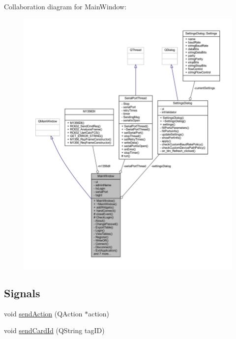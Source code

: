 Collaboration diagram for Main\+Window\+:
\nopagebreak
\begin{figure}[H]
\begin{center}
\leavevmode
\includegraphics[width=350pt]{class_main_window__coll__graph}
\end{center}
\end{figure}
\subsection*{Signals}
\begin{DoxyCompactItemize}
\item 
void \mbox{\hyperlink{class_main_window_a8d4383f0927af91b372168fe024b4278}{send\+Action}} (Q\+Action $\ast$action)
\item 
void \mbox{\hyperlink{class_main_window_acd99802d86721ec111aa989a80b96ae3}{send\+Card\+Id}} (Q\+String tag\+ID)
\end{DoxyCompactItemize}
